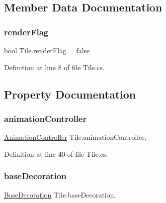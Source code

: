\subsection{Member Data Documentation}
\mbox{\label{class_tile_a1a28313208606507b9c570a141461eab}} 
\subsubsection{\texorpdfstring{renderFlag}{renderFlag}}
{\footnotesize\ttfamily bool Tile.\+render\+Flag = false}



Definition at line 8 of file Tile.\+cs.



\subsection{Property Documentation}
\mbox{\label{class_tile_a539da027add6656c04726ee3f8c169a3}} 
\subsubsection{\texorpdfstring{animationController}{animationController}}
{\footnotesize\ttfamily \mbox{\hyperlink{class_animation_controller}{Animation\+Controller}} Tile.\+animation\+Controller\hspace{0.3cm}{\ttfamily [get]}, {\ttfamily [set]}}



Definition at line 40 of file Tile.\+cs.

\mbox{\label{class_tile_a73a26ee1d73d9418cf55d4a8ec585910}} 
\subsubsection{\texorpdfstring{baseDecoration}{baseDecoration}}
{\footnotesize\ttfamily \mbox{\hyperlink{class_base_decoration}{Base\+Decoration}} Tile.\+base\+Decoration\hspace{0.3cm}{\ttfamily [get]}, {\ttfamily [set]}}



